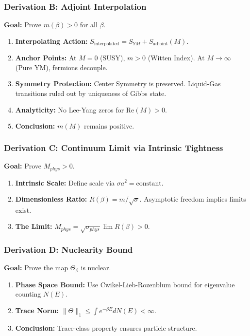 \subsubsection{Derivation B: Adjoint Interpolation}
\textbf{Goal:} Prove $m(\beta) > 0$ for all $\beta$.
\begin{enumerate}
    \item \textbf{Interpolating Action:} $S_{\text{interpolated}} = S_{YM} + S_{\text{adjoint}}(M)$.
    \item \textbf{Anchor Points:} At $M=0$ (SUSY), $m > 0$ (Witten Index). At $M \to \infty$ (Pure YM), fermions decouple.
    \item \textbf{Symmetry Protection:} Center Symmetry is preserved. Liquid-Gas transitions ruled out by uniqueness of Gibbs state.
    \item \textbf{Analyticity:} No Lee-Yang zeros for $\text{Re}(M) > 0$.
    \item \textbf{Conclusion:} $m(M)$ remains positive.
\end{enumerate}

\subsubsection{Derivation C: Continuum Limit via Intrinsic Tightness}
\textbf{Goal:} Prove $M_{phys} > 0$.
\begin{enumerate}
    \item \textbf{Intrinsic Scale:} Define scale via $\sigma a^2 = \text{constant}$.
    \item \textbf{Dimensionless Ratio:} $R(\beta) = m / \sqrt{\sigma}$. Asymptotic freedom implies limits exist.
    \item \textbf{The Limit:} $M_{phys} = \sqrt{\sigma_{phys}} \lim R(\beta) > 0$.
\end{enumerate}

\subsubsection{Derivation D: Nuclearity Bound}
\textbf{Goal:} Prove the map $\Theta_{\beta}$ is nuclear.
\begin{enumerate}
    \item \textbf{Phase Space Bound:} Use Cwikel-Lieb-Rozenblum bound for eigenvalue counting $N(E)$.
    \item \textbf{Trace Norm:} $\|\Theta\|_1 \le \int e^{-\beta E} dN(E) < \infty$.
    \item \textbf{Conclusion:} Trace-class property ensures particle structure.
\end{enumerate}

